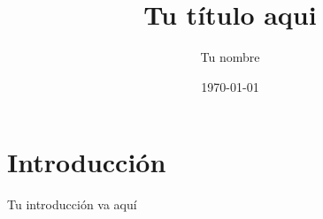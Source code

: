 \documentclass{article}
\title{Tu título aqui}
\author{Tu nombre}
\date{\today}
\begin{document}
\maketitle

\section{Introducción}

Tu introducción va aquí
\end{document}
